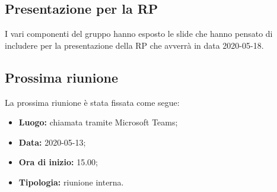 	\subsection{Presentazione per la RP}
	I vari componenti del gruppo hanno esposto le slide che hanno pensato di includere per la presentazione della RP che avverrà in data 2020-05-18.
		
		
	\subsection{Prossima riunione}
		La prossima riunione è stata fissata come segue:
		\begin{itemize}
			\item \textbf{Luogo:} chiamata tramite Microsoft Teams; 
			\item \textbf{Data:} 2020-05-13;
			\item \textbf{Ora di inizio:} 15.00;
			\item \textbf{Tipologia:} riunione interna.
		\end{itemize}
